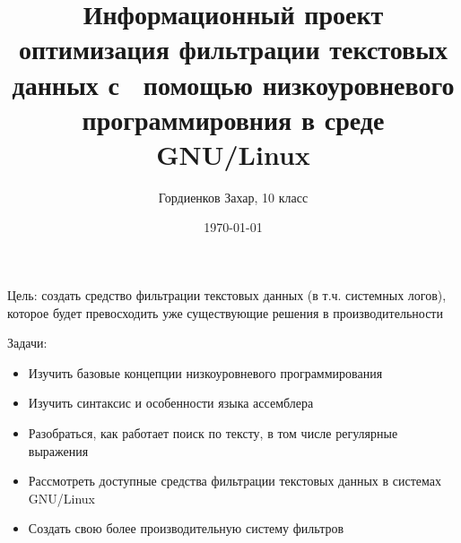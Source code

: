 \documentclass[a4paper]{article}
\title{Информационный проект \flqq{}оптимизация фильтрации текстовых данных с \
	помощью низкоуровневого программировния в среде GNU/Linux\frqq{}}
\author{Гордиенков Захар, 10 класс}
\date{\today}
\begin{document}
\maketitle
\pagebreak
{\small\tableofcontents}
\pagebreak

Цель: создать средство фильтрации текстовых данных (в т.ч. системных логов),
которое будет превосходить уже существующие решения в
производительности

Задачи:
\begin{itemize}
	\item Изучить базовые концепции низкоуровневого программирования
	\item Изучить синтаксис и особенности языка ассемблера
	\item Разобраться, как работает поиск по тексту, в том числе регулярные
	выражения
	\item Рассмотреть доступные средства фильтрации текстовых данных в
	системах GNU/Linux
	\item Создать свою более производительную систему фильтров
\end{itemize}

\pagebreak
\end{document}

